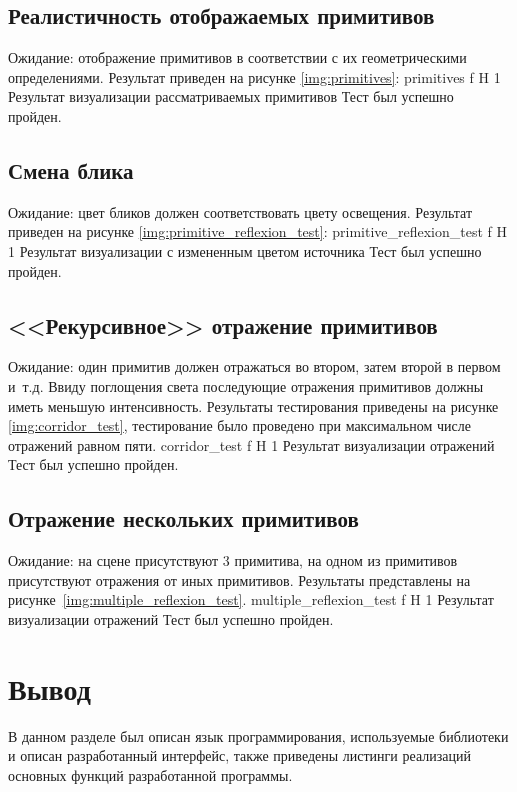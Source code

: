 \subsection{Реалистичность отображаемых примитивов}
Ожидание: отображение примитивов  в соответствии с их геометрическими определениями.
Результат приведен на рисунке \ref{img:primitives}:
{primitives} %
{f} %
{H} %
{1\textwidth} %
{Результат визуализации рассматриваемых примитивов} %
Тест был успешно пройден.

\subsection{Смена блика}
Ожидание: цвет бликов должен соответствовать цвету освещения.
Результат приведен на рисунке \ref{img:primitive_reflexion_test}:
{primitive_reflexion_test} %
{f} %
{H} %
{1\textwidth} %
{Результат визуализации с измененным цветом источника} %
Тест был успешно пройден.

\subsection{<<Рекурсивное>> отражение примитивов}
Ожидание: один примитив должен отражаться во втором, затем второй в первом и~т.д. Ввиду поглощения света последующие отражения примитивов должны иметь меньшую интенсивность. Результаты тестирования приведены на рисунке \ref{img:corridor_test}, тестирование было проведено при максимальном числе отражений равном пяти.
{corridor_test} %
{f} %
{H} %
{1\textwidth} %
{Результат визуализации отражений} %
Тест был успешно пройден.

\subsection{Отражение нескольких примитивов}
Ожидание: на сцене присутствуют 3 примитива, на одном из примитивов  присутствуют отражения от иных примитивов. Результаты представлены на рисунке~\ref{img:multiple_reflexion_test}.
{multiple_reflexion_test} %
{f} %
{H} %
{1\textwidth} %
{Результат визуализации отражений} %
Тест был успешно пройден.

\section*{Вывод}

В данном разделе был описан язык программирования, используемые библиотеки и описан разработанный интерфейс, также приведены листинги реализаций основных функций разработанной программы.









